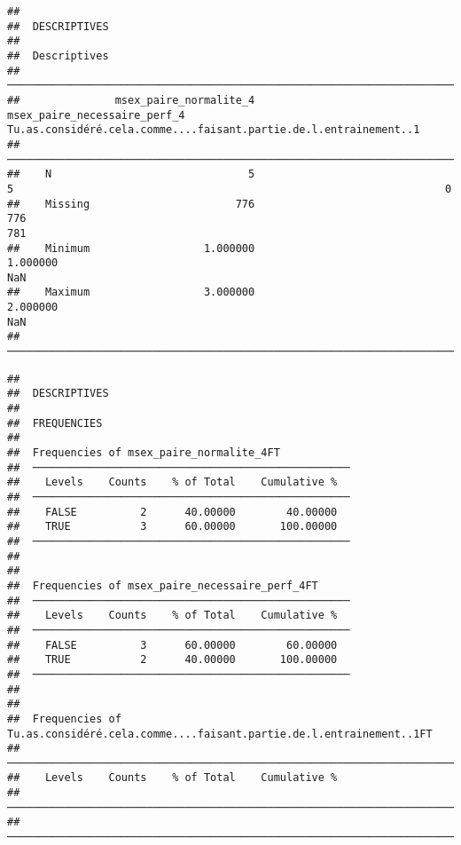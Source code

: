 \documentclass[
]{article}
\begin{document}
\begin{verbatim}
## 
##  DESCRIPTIVES
## 
##  Descriptives                                                                                                                               
##  ────────────────────────────────────────────────────────────────────────────────────────────────────────────────────────────────────────── 
##               msex_paire_normalite_4    msex_paire_necessaire_perf_4    Tu.as.considéré.cela.comme....faisant.partie.de.l.entrainement..1   
##  ────────────────────────────────────────────────────────────────────────────────────────────────────────────────────────────────────────── 
##    N                               5                               5                                                                    0   
##    Missing                       776                             776                                                                  781   
##    Minimum                  1.000000                        1.000000                                                                  NaN   
##    Maximum                  3.000000                        2.000000                                                                  NaN   
##  ──────────────────────────────────────────────────────────────────────────────────────────────────────────────────────────────────────────
\end{verbatim}

\begin{verbatim}
## 
##  DESCRIPTIVES
## 
##  FREQUENCIES
## 
##  Frequencies of msex_paire_normalite_4FT            
##  ────────────────────────────────────────────────── 
##    Levels    Counts    % of Total    Cumulative %   
##  ────────────────────────────────────────────────── 
##    FALSE          2      40.00000        40.00000   
##    TRUE           3      60.00000       100.00000   
##  ────────────────────────────────────────────────── 
## 
## 
##  Frequencies of msex_paire_necessaire_perf_4FT      
##  ────────────────────────────────────────────────── 
##    Levels    Counts    % of Total    Cumulative %   
##  ────────────────────────────────────────────────── 
##    FALSE          3      60.00000        60.00000   
##    TRUE           2      40.00000       100.00000   
##  ────────────────────────────────────────────────── 
## 
## 
##  Frequencies of Tu.as.considéré.cela.comme....faisant.partie.de.l.entrainement..1FT 
##  ────────────────────────────────────────────────────────────────────────────────── 
##    Levels    Counts    % of Total    Cumulative %   
##  ────────────────────────────────────────────────────────────────────────────────── 
##  ──────────────────────────────────────────────────────────────────────────────────
\end{verbatim}
\end{document}
